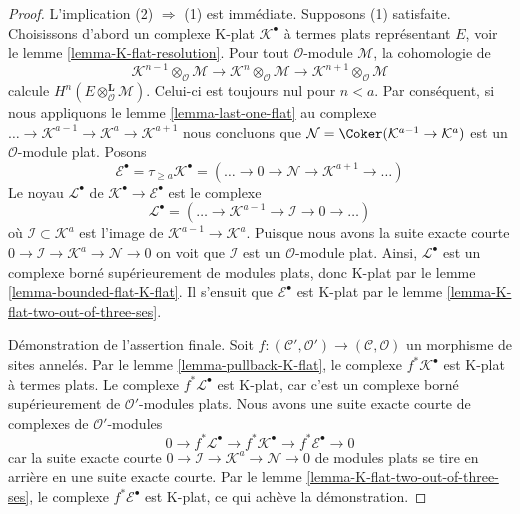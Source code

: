 \begin{proof}
L'implication (2) $\Rightarrow$ (1) est immédiate. Supposons (1) satisfaite.
Choisissons d'abord un complexe K-plat $\mathcal{K}^\bullet$ à termes plats
représentant $E$, voir le lemme \ref{lemma-K-flat-resolution}. Pour tout
$\mathcal{O}$-module $\mathcal{M}$, la cohomologie de
$$
\mathcal{K}^{n - 1} \otimes_\mathcal{O} \mathcal{M} \to
\mathcal{K}^n \otimes_\mathcal{O} \mathcal{M} \to
\mathcal{K}^{n + 1} \otimes_\mathcal{O} \mathcal{M}
$$
calcule $H^n(E \otimes_\mathcal{O}^\mathbf{L} \mathcal{M})$. Celui-ci est
toujours nul pour $n < a$. Par conséquent, si nous appliquons le lemme
\ref{lemma-last-one-flat} au complexe
$\ldots \to \mathcal{K}^{a - 1} \to \mathcal{K}^a \to \mathcal{K}^{a + 1}$
nous concluons que
$\mathcal{N} = \Coker(\mathcal{K}^{a - 1} \to \mathcal{K}^a)$ est un
$\mathcal{O}$-module plat. Posons
$$
\mathcal{E}^\bullet = \tau_{\geq a}\mathcal{K}^\bullet =
(\ldots \to 0 \to \mathcal{N} \to \mathcal{K}^{a + 1} \to \ldots )
$$
Le noyau $\mathcal{L}^\bullet$ de
$\mathcal{K}^\bullet \to \mathcal{E}^\bullet$ est le complexe
$$
\mathcal{L}^\bullet = (\ldots \to \mathcal{K}^{a - 1} \to
\mathcal{I} \to 0 \to \ldots)
$$
où $\mathcal{I} \subset \mathcal{K}^a$ est l'image de
$\mathcal{K}^{a - 1} \to \mathcal{K}^a$. Puisque nous avons la suite exacte
courte
$0 \to \mathcal{I} \to \mathcal{K}^a \to \mathcal{N} \to 0$
on voit que $\mathcal{I}$ est un $\mathcal{O}$-module plat. Ainsi,
$\mathcal{L}^\bullet$ est un complexe borné supérieurement de modules plats,
donc K-plat par le lemme \ref{lemma-bounded-flat-K-flat}. Il s'ensuit que
$\mathcal{E}^\bullet$ est K-plat par le lemme
\ref{lemma-K-flat-two-out-of-three-ses}.

\medskip\noindent
Démonstration de l'assertion finale. Soit
$f : (\mathcal{C}', \mathcal{O}') \to (\mathcal{C}, \mathcal{O})$
un morphisme de sites annelés. Par le lemme \ref{lemma-pullback-K-flat}, le
complexe $f^*\mathcal{K}^\bullet$ est K-plat à termes plats. Le complexe
$f^*\mathcal{L}^\bullet$ est K-plat, car c'est un complexe borné
supérieurement de $\mathcal{O}'$-modules plats. Nous avons une suite exacte
courte de complexes de $\mathcal{O}'$-modules
$$
0 \to f^*\mathcal{L}^\bullet \to f^*\mathcal{K}^\bullet \to
f^*\mathcal{E}^\bullet \to 0
$$
car la suite exacte courte
$0 \to \mathcal{I} \to \mathcal{K}^a \to \mathcal{N} \to 0$
de modules plats se tire en arrière en une suite exacte courte. Par le lemme
\ref{lemma-K-flat-two-out-of-three-ses}, le complexe
$f^*\mathcal{E}^\bullet$ est K-plat, ce qui achève la démonstration.
\end{proof}


